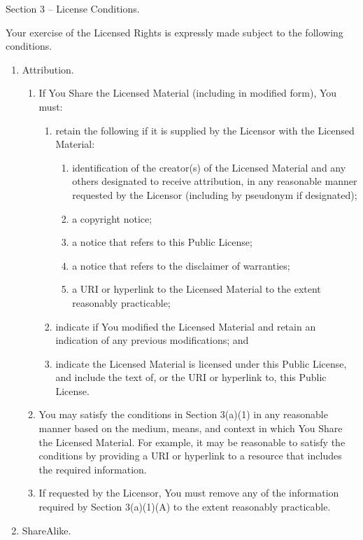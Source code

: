\documentclass[
]{scrbook}
\begin{document}
Section 3 -- License Conditions.

Your exercise of the Licensed Rights is expressly made subject to the
following conditions.

\begin{enumerate}
\def\labelenumi{\alph{enumi}.}
\item
  Attribution.

  \begin{enumerate}
  \def\labelenumii{\arabic{enumii}.}
  \item
    If You Share the Licensed Material (including in modified form), You
    must:

    \begin{enumerate}
    \def\labelenumiii{\alph{enumiii}.}
    \item
      retain the following if it is supplied by the Licensor with the
      Licensed Material:

      \begin{enumerate}
      \def\labelenumiv{\roman{enumiv}.}
      \item
        identification of the creator(s) of the Licensed Material and
        any others designated to receive attribution, in any reasonable
        manner requested by the Licensor (including by pseudonym if
        designated);
      \item
        a copyright notice;
      \item
        a notice that refers to this Public License;
      \item
        a notice that refers to the disclaimer of warranties;
      \item
        a URI or hyperlink to the Licensed Material to the extent
        reasonably practicable;
      \end{enumerate}
    \item
      indicate if You modified the Licensed Material and retain an
      indication of any previous modifications; and
    \item
      indicate the Licensed Material is licensed under this Public
      License, and include the text of, or the URI or hyperlink to, this
      Public License.
    \end{enumerate}
  \item
    You may satisfy the conditions in Section 3(a)(1) in any reasonable
    manner based on the medium, means, and context in which You Share
    the Licensed Material. For example, it may be reasonable to satisfy
    the conditions by providing a URI or hyperlink to a resource that
    includes the required information.
  \item
    If requested by the Licensor, You must remove any of the information
    required by Section 3(a)(1)(A) to the extent reasonably practicable.
  \end{enumerate}
\item
  ShareAlike.


\end{enumerate}
\end{document}
